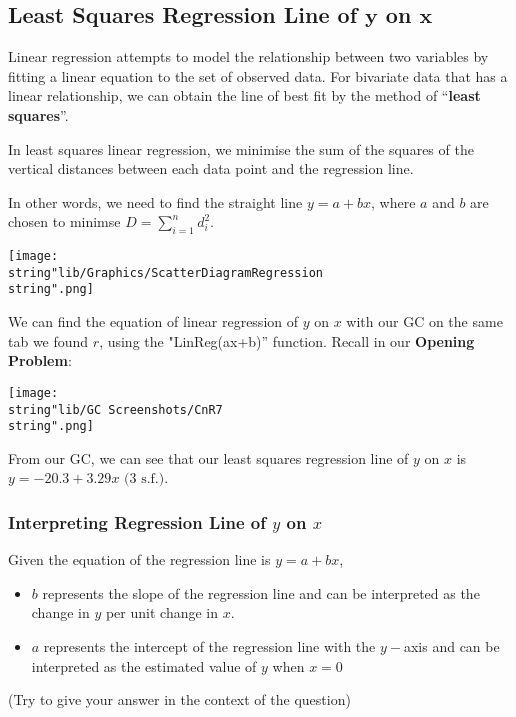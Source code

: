 \documentclass[11pt,a4paper]{book}
\begin{document}
\subsection{Least Squares Regression Line of $\boldsymbol{y}$ on $\boldsymbol{x}$}

Linear regression attempts to model the relationship between two variables
by fitting a linear equation to the set of observed data. For bivariate
data that has a linear relationship, we can obtain the line of best
fit by the method of ``\textbf{least squares}''.

\begin{minipage}[t]{.5\textwidth}

In least squares linear regression, we minimise the sum of the squares
of the vertical distances between each data point and the regression
line.

\medskip

In other words, we need to find the straight line $y=a+bx$, where
$a$ and $b$ are chosen to minimse ${\displaystyle D=\sum_{i=1}^{n}d_{i}^{2}}$.

\end{minipage}
\begin{minipage}[t]{.5\textwidth}
\begin{center}
\texttt{[image: \\string"lib/Graphics/ScatterDiagramRegression\\string".png]}
\par\end{center}

\end{minipage}

We can find the equation of linear regression of $y$ on $x$ with
our GC on the same tab we found $r$, using the "LinReg(ax+b)'' function.
Recall in our \textbf{Opening Problem}:
\begin{center}
\texttt{[image: \\string"lib/GC Screenshots/CnR7\\string".png]}
\par\end{center}

From our GC, we can see that our least squares regression line of
$y$ on $x$ is $y=-20.3+3.29x\text{ (3 s.f.)}$.

\subsubsection{Interpreting Regression Line of $y$ on $x$}

Given the equation of the regression line is $y=a+bx$,
\begin{itemize}
\item $b$ represents the slope of the regression line and can be interpreted
as the change in $y$ per unit change in $x$.
\item $a$ represents the intercept of the regression line with the $y-$axis
and can be interpreted as the estimated value of $y$ when $x=0$
\end{itemize}
(Try to give your answer in the context of the question)
\end{document}

